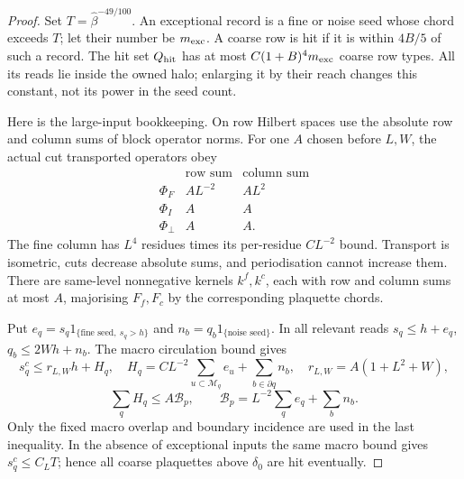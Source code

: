 \documentclass[11pt,reqno]{amsart}
\numberwithin{equation}{section}
\theoremstyle{definition}
\theoremstyle{remark}
\begin{document}
\begin{proof}
Set \(T=\widehat\beta^{-49/100}\). An exceptional record is
a fine or noise seed whose chord exceeds \(T\); let their
number be \(m_{\rm exc}\). A coarse row is hit if it is within
\(4B/5\) of such a record. The hit set \(Q_{\rm hit}\) has at most
\(C(1+B)^4m_{\rm exc}\) coarse row types. All its reads lie
inside the owned halo; enlarging it by their reach changes this
constant, not its power in the seed count.

Here is the large-input bookkeeping. On row Hilbert spaces use
the absolute row and column sums of block operator norms. For
one \(A\) chosen before \(L,W\), the actual cut transported
operators obey
\begin{equation}
 \begin{array}{c|cc}
       &\text{row sum}&\text{column sum}\\ \hline
 \Phi_F&AL^{-2}&AL^2\\
 \Phi_I&A&A\\
 \Phi_\perp&A&A.
 \end{array}
 \label{eq:packet-row-column-table}
\end{equation}
The fine column has \(L^4\) residues times its per-residue
\(CL^{-2}\) bound. Transport is isometric, cuts decrease
absolute sums, and periodisation cannot increase them.
There are same-level nonnegative kernels \(k^f,k^c\), each
with row and column sums at most \(A\), majorising \(F_f,F_c\)
by the corresponding plaquette chords.

Put \(e_q=s_q1_{\{\text{fine seed},\ s_q>h\}}\) and
\(n_b=q_b1_{\{\text{noise seed}\}}\). In all relevant reads
\(s_q\le h+e_q\), \(q_b\le2Wh+n_b\).
The macro circulation bound gives
\[
 s_q^c\le r_{L,W}h+H_q,\quad
 H_q=CL^{-2}\sum_{u\subset\mathcal M_q}e_u
                       +\sum_{b\in\partial q}n_b,
 \quad r_{L,W}=A(1+L^2+W),
\]
\[
 \sum_qH_q\le A\mathcal B_p,\qquad
                  \mathcal B_p=L^{-2}\sum_qe_q+\sum_bn_b.
\]
Only the fixed macro overlap and boundary incidence are used in
the last inequality. In the absence of exceptional inputs the
same macro bound gives \(s_q^c\le C_LT\); hence all coarse
plaquettes above \(\delta_0\) are hit eventually.


\end{proof}
\end{document}

